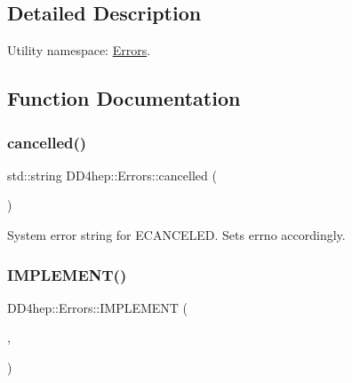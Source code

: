 \subsection{Detailed Description}
Utility namespace\+: \hyperlink{namespace_d_d4hep_1_1_errors}{Errors}. 

\subsection{Function Documentation}
\hypertarget{namespace_d_d4hep_1_1_errors_a69cd23934005401444f50404ab454f53}{}\label{namespace_d_d4hep_1_1_errors_a69cd23934005401444f50404ab454f53} 
\subsubsection{\texorpdfstring{cancelled()}{cancelled()}}
{\footnotesize\ttfamily std\+::string D\+D4hep\+::\+Errors\+::cancelled (\begin{DoxyParamCaption}{ }\end{DoxyParamCaption})}



System error string for E\+C\+A\+N\+C\+E\+L\+ED. Sets errno accordingly. 

\hypertarget{namespace_d_d4hep_1_1_errors_ada3397937d99e255f7b5770f5ab80888}{}\label{namespace_d_d4hep_1_1_errors_ada3397937d99e255f7b5770f5ab80888} 
\subsubsection{\texorpdfstring{I\+M\+P\+L\+E\+M\+E\+N\+T()}{IMPLEMENT()}\hspace{0.1cm}{\footnotesize\ttfamily [1/4]}}
{\footnotesize\ttfamily D\+D4hep\+::\+Errors\+::\+I\+M\+P\+L\+E\+M\+E\+NT (\begin{DoxyParamCaption}\item[{\hyperlink{namespace_d_d4hep_1_1_errors_aa34e378024a1269ccd3f23a0c9d9607b}{no\+Permission}}]{,  }\item[{E\+P\+E\+RM}]{ }\end{DoxyParamCaption})}

\hypertarget{namespace_d_d4hep_1_1_errors_ae2932c4d59d7f6a7476733ba238050f6}{}\label{namespace_d_d4hep_1_1_errors_ae2932c4d59d7f6a7476733ba238050f6} 

